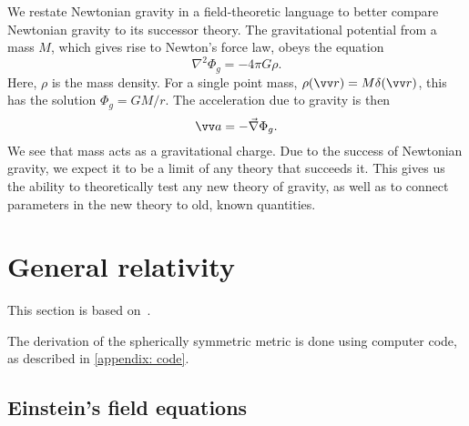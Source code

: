 We restate Newtonian gravity in a field-theoretic language to better compare Newtonian gravity to its successor theory.
The gravitational potential from a mass $M$, which gives rise to Newton's force law, obeys the equation
%
\begin{equation}
    \nabla^2 \Phi_g = - 4 \pi G \rho.
\end{equation}
%
Here, $\rho$ is the mass density.
For a single point mass, $\rho(\vv r) = M \delta(\vv r)$, this has the solution $\Phi_g = G M / r$.
The acceleration due to gravity is then
%
\begin{equation}
    \label{acceleration from Newtonian gravitational potential}
    \vv a = - \vec \nabla \Phi_g.
\end{equation}
%
We see that mass acts as a gravitational charge.
Due to the success of Newtonian gravity, we expect it to be a limit of any theory that succeeds it.
This gives us the ability to theoretically test any new theory of gravity, as well as to connect parameters in the new theory to old, known quantities.



\section{General relativity}
This section is based on~\cite{carrollSpacetimeGeometryIntroduction2019,glendenningCompactStarsNuclear2012}.

The derivation of the spherically symmetric metric is done using computer code, as described in \autoref{appendix: code}.



\subsection{Einstein's field equations}

